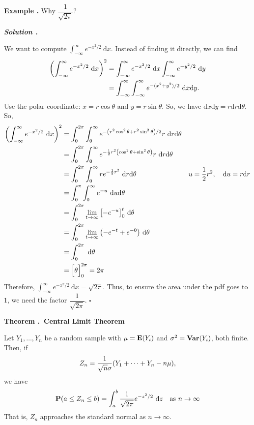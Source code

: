 \documentclass[12pt, a4paper]{article}
\newcounter{index}[subsection]
\newenvironment*{eg}{\begin{framed}\par\noindent\textbf{Example \thesubsection.\stepcounter{index}\theindex}}{\par\end{framed}}
\newenvironment*{thm}[1]{\begin{tcolorbox}\par\noindent\textbf{Theorem \thesubsection.\stepcounter{index}\theindex\ #1} \par}{\par\end{tcolorbox}}
\newcounter{nprf}[subsection]
\newenvironment*{sol}{\par\indent\textbf{\textit{Solution \stepcounter{nprf}\thenprf.}}\par}{\hfill{$\square$}\par}
\def\d{\mathrm{d}}
\def\dsst{\displaystyle}
\def\E{\vb{E}}
\def\Var{\vb{Var}}
\def\P{\vb{P}}
\begin{document}
\begin{eg}
	Why $\dfrac{1}{\sqrt{2\pi}}$?
	\begin{sol}
		We want to compute $\dsst\int_{-\infty}^\infty e^{-x^2/2}\ \d{x}$. Instead of finding it directly, we can find \begin{align*}\qty(\int_{-\infty}^\infty e^{-x^2/2}\ \d{x})^2&=\int_{-\infty}^\infty e^{-x^2/2}\ \d{x}\int_{-\infty}^\infty e^{-y^2/2}\ \d{y}\\&=\int_{-\infty}^\infty\int_{-\infty}^\infty e^{-(x^2+y^2)/2}\ \d{x}\d{y}.\end{align*} Use the polar coordinate: $x=r\cos\theta$ and $y=r\sin\theta$. So, we have $\d{x}\d{y}=r\d{r}\d{\theta}$. So, \begin{align*}\qty(\int_{-\infty}^\infty e^{-x^2/2}\ \d{x})^2&=\int_0^{2\pi}\int_0^{\infty}e^{-\qty(r^2\cos^2\theta+r^2\sin^2\theta)/2}r\ \d{r}\d{\theta}\\&=\int_0^{2\pi}\int_0^{\infty}e^{-\frac{1}{2}r^2\qty(\cos^2\theta+\sin^2\theta)}r\ \d{r}\d{\theta}\\&=\int_0^{2\pi}\int_0^{\infty}re^{-\frac{1}{2}r^2}\ \d{r}\d{\theta}&u=\frac{1}{2}r^2,\quad \d{u}=r\d{r}\\&=\int_0^{\pi}\int_0^\infty e^{-u}\ \d{u}\d{\theta}\\&=\int_0^{2\pi}\lim_{t\to\infty}\qty[-e^{-u}]_0^t\ \d{\theta}\\&=\int_0^{2\pi}\lim_{t\to\infty}\qty(-e^{-t}+e^{-0})\ \d{\theta}\\&=\int_0^{2\pi}\ \d{\theta}\\&=\qty\Big[\theta]_0^{2\pi}=2\pi\end{align*} Therefore, $\dsst\int_{-\infty}^\infty e^{-x^2/2}\ \d{x}=\sqrt{2\pi}$. Thus, to ensure the area under the pdf goes to $1$, we need the factor $\dfrac{1}{\sqrt{2\pi}}$.
	\end{sol}
\end{eg}
\begin{thm}{Central Limit Theorem}
	Let $Y_1,\dots,Y_n$ be a random sample with $\mu=\E\qty(Y_i)$ and $\sigma^2=\Var\qty(Y_i)$, both finite. Then, if \[Z_n=\dfrac{1}{\sqrt{n}\sigma}\qty(Y_1+\cdots+Y_n-n\mu),\]	 we have \[\P(a\leq Z_n\leq b)=\int_a^b\dfrac{1}{\sqrt{2\pi}}e^{-z^2/2}\ \d{z}\quad \text{as }n\to\infty\] That is, $Z_n$ approaches the standard normal as $n\to\infty$.
\end{thm}
\end{document}
